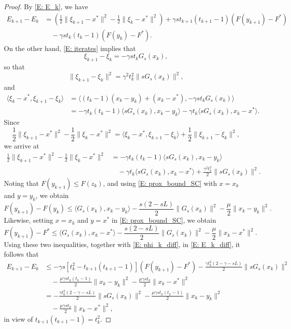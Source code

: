 \documentclass[10pt,a4paper]{amsart}
\begin{document}
\begin{proof}
By \eqref{E: E_k}, we have
\begin{equation}\label{E: E_k_diff}
\begin{aligned}
E_{k+1} - E_k
&= \left( \frac{1}{2}\| \xi_{k+1} - x^* \|^2 - \frac{1}{2}\| \xi_k - x^* \|^2 \right)
 + \gamma s t_{k+1} (t_{k+1}-1) \left( F(y_{k+1}) - F^* \right) \\
&\quad - \gamma s t_k(t_k-1) \left( F(y_k) - F^* \right).
\end{aligned}
\end{equation}
On the other hand, \eqref{E: iterates} implies that
$$\xi_{k+1} - \xi_k = -\gamma s t_k G_s(x_k),$$
so that
$$ \| \xi_{k+1} - \xi_k \|^2 = \gamma^2 t_k^2 \| s G_s(x_k) \|^2, $$
and
\begin{align*}
\langle \xi_k-x^*, \xi_{k+1} - \xi_k \rangle 
&= \langle (t_k-1)(x_k-y_k) + (x_k-x^*), -\gamma s t_k G_s(x_k) \rangle\\
&= - \gamma t_k (t_k-1) \langle sG_s(x_k), x_k-y_k \rangle 
 - \gamma t_k \langle s G_s(x_k), x_k-x^* \rangle.  
\end{align*}
Since
$$\frac{1}{2}\| \xi_{k+1} - x^* \|^2 - \frac{1}{2}\| \xi_k - x^* \|^2 = \langle \xi_k - x^*, \xi_{k+1} - \xi_k \rangle + \frac{1}{2}\| \xi_{k+1} - \xi_k \|^2,$$
we arrive at
\begin{equation}\label{E: phi_k_diff}
\begin{aligned}
\frac{1}{2}\| \xi_{k+1} - x^* \|^2 - \frac{1}{2}\| \xi_k - x^* \|^2 
&= - \gamma t_k (t_k-1) \langle sG_s(x_k), x_k-y_k \rangle \\ 
&\quad - \gamma t_k \langle s G_s(x_k), x_k-x^* \rangle
   + \frac{\gamma^2 t_k^2}{2}\| sG_s(x_k) \|^2.
\end{aligned}
\end{equation}
Noting that $F(y_{k+1}) \le F(z_k)$, and using \eqref{E: prox_bound_SC} with $x=x_k$ and $y=y_k$, we obtain
$$ F(y_{k+1}) - F(y_k) 
\le \langle G_s(x_k), x_k - y_k \rangle 
  - \frac{s(2-sL)}{2}\| G_s(x_k) \|^2  
  - \frac{\mu}{2}\|x_k-y_k \|^2. $$
Likewise, setting $x=x_k$ and $y=x^*$ in \eqref{E: prox_bound_SC}, we obtain
\begin{equation}\label{E:DeltaE_1}
F(y_{k+1}) - F^*
\le \langle G_s(x_k), x_k-x^* \rangle    
    - \frac{s(2-sL)}{2}\| G_s(x_k) \|^2
    - \frac{\mu}{2}\|x_k-x^* \|^2.
\end{equation}
Using these two inequalities, together with \eqref{E: phi_k_diff}, in \eqref{E: E_k_diff}, it follows that
\begin{align*}
E_{k+1} - E_k  
&\le - \gamma s\left[ t_k^2 - t_{k+1}(t_{k+1}-1) \right] \left( F(y_{k+1}) - F^* \right) 
  - \frac{\gamma t_k^2(2-\gamma-sL)}{2}\| sG_s(x_k) \|^2 \\  
&\quad - \frac{\mu \gamma s t_k(t_k-1)}{2}\|x_k-y_k \|^2
  - \frac{\mu\gamma s t_k}{2}\|x_k-x^* \|^2 \\
&= - \frac{\gamma t_k^2(2-\gamma-sL)}{2}\| sG_s(x_k) \|^2
   - \frac{\mu \gamma s t_k(t_k-1)}{2} \|x_k-y_k \|^2 \\
&\quad - \frac{\mu\gamma s t_k}{2}\|x_k-x^* \|^2,
\end{align*}
in view of $t_{k+1}(t_{k+1}-1)=t_k^2$.
\end{proof}
\end{document}
